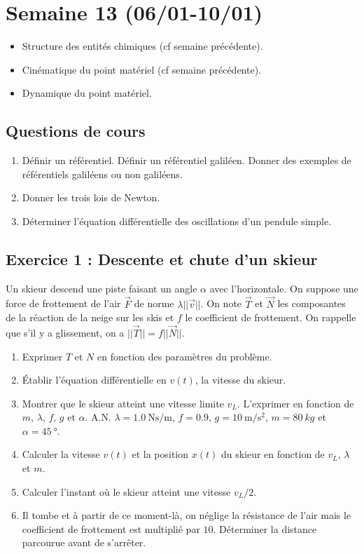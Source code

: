 \section{Semaine 13 (06/01-10/01) }


\begin{itemize}
	\item Structure des entités chimiques (cf semaine précédente).
	\item Cinématique du point matériel (cf semaine précédente).
	\item Dynamique du point matériel.
\end{itemize}

\subsection{Questions de cours}

\begin{enumerate}
	\item Définir un référentiel. Définir un référentiel galiléen. Donner des exemples de référentiels galiléens ou non galiléens.
	\item Donner les trois lois de Newton.
	\item Déterminer l'équation différentielle des oscillations d'un pendule simple.
\end{enumerate}

\subsection{Exercice 1 : Descente et chute d'un skieur}

Un skieur descend une piste faisant un angle $\alpha$ avec l’horizontale. On suppose une force de frottement de l’air $\vec{F}$ de norme $\lambda ||\vec{v}||$. On note $\vec{T}$ et $\vec{N}$ les composantes de la réaction de la neige sur les skis et $f$ le coefficient de frottement. On rappelle que s'il y a glissement, on a $||\vec{T}|| = f ||\vec{N}||$.

\begin{enumerate}
	\item Exprimer $T$ et $N$ en fonction des paramètres du problème.
	\item Établir l’équation différentielle en $v(t)$, la vitesse du skieur.
	\item Montrer que le skieur atteint une vitesse limite $v_L$. L'exprimer en fonction de $m$, $\lambda$, $f$, $g$ et $\alpha$. A.N. $\lambda = \SI{1.0}{\newton \second \per \meter}$, $f = 0.9$, $g = \SI{10}{\meter\per\second\squared}$, $m = \SI{80}{kg}$ et $\alpha = \SI{45}{\degree}$.
	\item Calculer la vitesse $v(t)$ et la position $x(t)$ du skieur en fonction de $v_L$, $\lambda$ et $m$.
	\item Calculer l’instant où le skieur atteint une vitesse $v_L/2$.
	\item Il tombe et à partir de ce moment-là, on néglige la résistance de l’air mais le coefficient de frottement est multiplié par $10$. Déterminer la distance parcourue avant de s’arrêter.
\end{enumerate}

